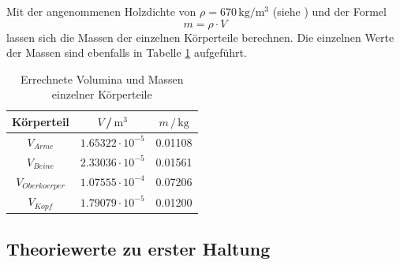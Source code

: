 Mit der angenommenen 
Holzdichte von $\rho = 670\,\si{\kilo\gram \per \cubic \meter}$ (siehe \cite{holz}) und der
Formel
\begin{equation}
    m = \rho \cdot V
\end{equation}
lassen sich die Massen der einzelnen Körperteile berechnen. Die einzelnen Werte der 
Massen sind ebenfalls in Tabelle \ref{tab:zz} aufgeführt.

\begin{table}[H]
\normalsize

\centering
{}
\begin{tabular}{c c c}
\toprule
    Körperteil &  $V$\,/\,$\si{\meter}^3$ & $m\,/\,\si{\kilogram}$ \\
    \midrule

$V_{Arme}$        &   $1.65322 \cdot 10^{-5}$  &  0.01108    \\
$V_{Beine}$       &   $2.33036 \cdot 10^{-5}$  &  0.01561    \\
$V_{Oberkoerper}$  &   $1.07555 \cdot 10^{-4}$  &  0.07206    \\
$V_{Kopf}$        &   $1.79079 \cdot 10^{-5}$  &  0.01200    \\

    \bottomrule
\end{tabular}
\caption{Errechnete Volumina und Massen einzelner Körperteile}
\label{tab:zz}
\end{table}



\subsection{Theoriewerte zu erster Haltung}

